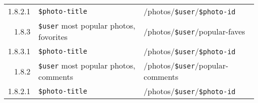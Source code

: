 \documentclass[11pt,a4paper]{article}
\newcommand{\var}[1]{\texttt{\${#1}}}
\begin{document}
\begin{center}
\begin{adjustwidth}{-8em}{-8em}
\begin{small}
\begin{longtable}{r|l|l}
                  1.8.2.1 &
                  \var{photo-title} &
                  /photos/\var{user}/\var{photo-id} \\

                1.8.3 &
                \var{user} most popular photos, fovorites &
                /photos/\var{user}/popular-faves \\

                  1.8.3.1 &
                  \var{photo-title} &
                  /photos/\var{user}/\var{photo-id} \\

                1.8.2 &
                \var{user} most popular photos, comments &
                /photos/\var{user}/popular-comments \\

                  1.8.2.1 &
                  \var{photo-title} &
                  /photos/\var{user}/\var{photo-id} \\


  \end{longtable}
\end{small}
\end{adjustwidth}
\end{center}
\end{document}
